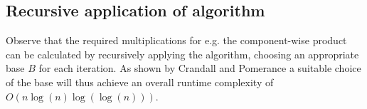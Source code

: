 \subsection{Recursive application of algorithm}

Observe that the required multiplications for e.g. the component-wise product
can be calculated by recursively applying the algorithm, choosing an
appropriate base $B$ for each iteration. As shown by Crandall and Pomerance a
suitable choice of the base will thus achieve an overall runtime complexity of
$O(n \log(n) \log(\log(n)))$. \autocite{crandallPrimeNumbersComputational2005}
